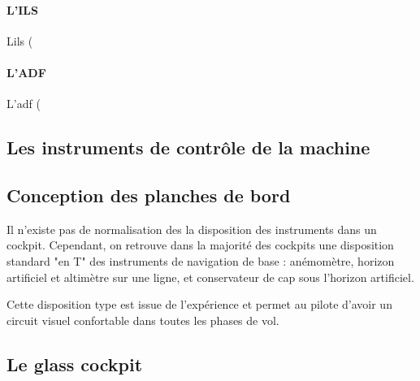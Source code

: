 	\paragraph{L'ILS}
	L\acrshort{ils} (
	
	\begin{figure}[H]	
	\centering
	\end{figure}
	
	\paragraph{L'ADF}
	L'\acrshort{adf} (
	
	\subsection{Les instruments de contrôle de la machine}
	
	\subsection{Conception des planches de bord}
	Il n'existe pas de normalisation des la disposition des instruments dans un cockpit. Cependant, on retrouve dans la majorité des cockpits une disposition standard "en T" des instruments de navigation de base : anémomètre, horizon artificiel et altimètre sur une ligne, et conservateur de cap sous l'horizon artificiel.
	
	\begin{figure}[H]	
	\centering
	\end{figure}
	
	Cette disposition type est issue de l'expérience et permet au pilote d'avoir un circuit visuel confortable dans toutes les phases de vol.
	
	\subsection{Le glass cockpit}
	
